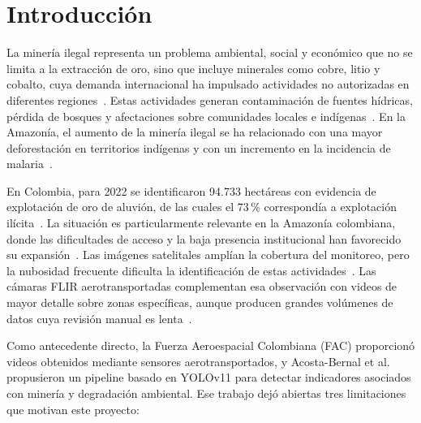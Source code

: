 \section{Introducción}
La minería ilegal representa un problema ambiental, social y económico que no se limita a la extracción de oro, sino que incluye minerales como cobre, litio y cobalto, cuya demanda internacional ha impulsado actividades no autorizadas en diferentes regiones~\cite{boafo2025sustainability}. Estas actividades generan contaminación de fuentes hídricas, pérdida de bosques y afectaciones sobre comunidades locales e indígenas~\cite{mulenga2024aquatic,dplf2024illegal}. En la Amazonía, el aumento de la minería ilegal se ha relacionado con una mayor deforestación en territorios indígenas y con un incremento en la incidencia de malaria~\cite{santos2026illegal,amaral2024malaria}.

En Colombia, para 2022 se identificaron 94.733 hectáreas con evidencia de explotación de oro de aluvión, de las cuales el 73\,\% correspondía a explotación ilícita~\cite{minminas2023explotacion}. La situación es particularmente relevante en la Amazonía colombiana, donde las dificultades de acceso y la baja presencia institucional han favorecido su expansión~\cite{romero2020mineria,torres2020reimagining}. Las imágenes satelitales amplían la cobertura del monitoreo, pero la nubosidad frecuente dificulta la identificación de estas actividades~\cite{moomen2024assessing,becerra2024creating}. Las cámaras FLIR aerotransportadas complementan esa observación con videos de mayor detalle sobre zonas específicas, aunque producen grandes volúmenes de datos cuya revisión manual es lenta~\cite{delahoz2025enhancing}.

Como antecedente directo, la Fuerza Aeroespacial Colombiana (FAC) proporcionó videos obtenidos mediante sensores aerotransportados, y Acosta-Bernal et al.~\cite{acosta2025eyes} propusieron un pipeline basado en YOLOv11 para detectar indicadores asociados con minería y degradación ambiental. Ese trabajo dejó abiertas tres limitaciones que motivan este proyecto:

